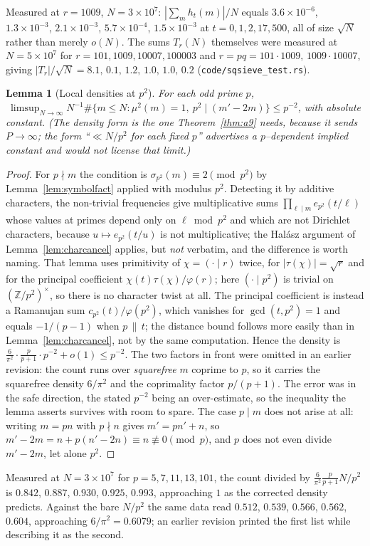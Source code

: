 \documentclass[11pt]{article}
\newtheorem{lemma}[theorem]{Lemma}
\theoremstyle{definition}
\begin{document}
Measured at $r=1009$, $N=3\times10^7$: $|\sum_m h_t(m)|/N$ equals $3.6\times10^{-6}$, $1.3\times10^{-3}$,
$2.1\times10^{-3}$, $5.7\times10^{-4}$, $1.5\times10^{-3}$ at $t=0,1,2,17,500$, all of size $\sqrt N$
rather than merely $o(N)$. The sums $T_r(N)$ themselves were measured at $N=5\times10^7$ for
$r=101,1009,10007,100003$ and $r=pq=101\cdot1009,\,1009\cdot10007$, giving
$|T_r|/\sqrt N=8.1,\,0.1,\,1.2,\,1.0,\,1.0,\,0.2$ \textup{(\texttt{code/sqsieve\_test.rs})}.

\begin{lemma}[Local densities at $p^2$]\label{lem:localsq}
For each odd prime $p$,
$\ \limsup_{N\to\infty}N^{-1}\#\{m\le N:\mu^2(m)=1,\ p^2\mid(m'-2m)\}\le p^{-2}$, with absolute
constant. \textup{(}The density form is the one Theorem~\ref{thm:a9} needs, because it sends
$P\to\infty$; the form ``$\ll N/p^2$ for each fixed $p$'' advertises a $p$--dependent implied
constant and would not license that limit.\textup{)}
\end{lemma}
\begin{proof}
For $p\nmid m$ the condition is $\sigma_{p^2}(m)\equiv2\pmod{p^2}$ by Lemma~\ref{lem:symbolfact}
applied with modulus $p^2$. Detecting it by additive characters, the non-trivial frequencies give
multiplicative sums $\prod_{\ell\mid m}e_{p^2}(t/\ell)$ whose values at primes depend only on
$\ell\bmod p^2$ and which are not Dirichlet characters, because $u\mapsto e_{p^2}(t/u)$ is not
multiplicative; the Hal\'asz argument of Lemma~\ref{lem:charcancel} applies, but \emph{not}
verbatim, and the difference is worth naming. That lemma uses primitivity of $\chi=(\cdot\mid r)$
twice, for $|\tau(\chi)|=\sqrt r$ and for the principal coefficient $\chi(t)\tau(\chi)/\varphi(r)$;
here $(\cdot\mid p^2)$ is trivial on $(\mathbb{Z}/p^2)^\times$, so there is no character twist at
all. The principal coefficient is instead a Ramanujan sum $c_{p^2}(t)/\varphi(p^2)$, which vanishes
for $\gcd(t,p^2)=1$ and equals $-1/(p-1)$ when $p\,\|\,t$; the distance bound follows more easily
than in Lemma~\ref{lem:charcancel}, not by the same computation. Hence the density is
$\tfrac6{\pi^2}\cdot\tfrac p{p+1}\cdot p^{-2}+o(1)\le p^{-2}$. The two factors in front were omitted
in an earlier revision: the count runs over \emph{squarefree} $m$ coprime to $p$, so it carries the
squarefree density $6/\pi^2$ and the coprimality factor $p/(p+1)$. The error was in the safe
direction, the stated $p^{-2}$ being an over-estimate, so the inequality the lemma asserts survives
with room to spare. The case $p\mid m$ does not arise at all: writing $m=pn$ with $p\nmid n$
gives $m'=pn'+n$, so $m'-2m=n+p(n'-2n)\equiv n\not\equiv0\pmod p$, and $p$ does not even divide
$m'-2m$, let alone $p^2$.
\end{proof}
Measured at $N=3\times10^7$ for $p=5,7,11,13,101$, the count divided by
$\tfrac6{\pi^2}\tfrac p{p+1}N/p^2$ is $0.842$, $0.887$, $0.930$, $0.925$, $0.993$, approaching $1$ as
the corrected density predicts. Against the bare $N/p^2$ the same data read $0.512$, $0.539$,
$0.566$, $0.562$, $0.604$, approaching $6/\pi^2=0.6079$; an earlier revision printed the first list
while describing it as the second.
\end{document}
